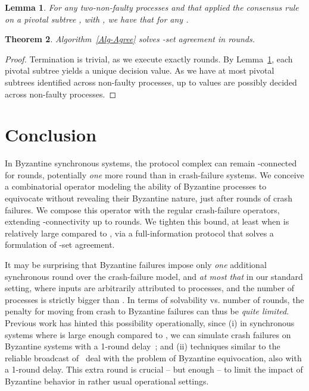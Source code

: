 \documentclass[11pt]{article}
\newtheorem{theorem}{Theorem}[section]
\newtheorem{lemma}[theorem]{Lemma}
\begin{document}
\begin{lemma}
\label{lemma-consensus-pivotal}
For any two-non-faulty processes  and  that applied the consensus rule on a pivotal subtree ,
with ,
we have that  for any .
\end{lemma}


\begin{comment}
\begin{lemma}
\label{lemma-decision-pivotal}
For any two-non-faulty processes  and  that decide based on a pivotal subtree ,
with ,
the decision value
(i) is well-defined;
and (ii) is an input value of a non-faulty process.
\end{lemma}
\end{comment}

\begin{theorem}
\label{theorem-ksetcorrectness}
Algorithm~\ref{Alg-Agree} solves -set agreement
in  rounds.
\end{theorem}
\begin{proof}
Termination is trivial,
as we execute exactly  rounds. 
By Lemma~\ref{lemma-consensus-pivotal},
each pivotal subtree yields a unique decision value.
As we have at most  pivotal subtrees identified across non-faulty processes,
up to  values are possibly decided across non-faulty processes.
\end{proof}

\section{Conclusion}

In Byzantine synchronous systems,
the protocol complex can remain -connected for  rounds,
potentially \emph{one} more round than in crash-failure systems.
We conceive a combinatorial operator modeling the ability of Byzantine processes
to equivocate without revealing their Byzantine nature,
just after  rounds of crash failures.
We compose this operator with the regular crash-failure operators,
extending -connectivity up to  rounds.
We tighten this bound,
at least when  is relatively large compared to ,
via a full-information protocol
that solves a formulation of -set agreement.

It may be surprising that Byzantine failures
impose only \emph{one} additional synchronous round over the crash-failure model,
and \emph{at most that} in our standard setting,
where inputs are arbitrarily attributed to processes,
and the number of processes is strictly bigger than .
In terms of solvability vs. number of rounds,
the penalty for moving from crash to Byzantine failures
can thus be \emph{quite limited}.
Previous work has hinted this possibility operationally, since
(i) in synchronous systems where  is large enough compared to ,
we can simulate crash failures on Byzantine systems with a 1-round delay~\cite{BazziNeiger01};
and (ii) techniques similar to the reliable broadcast of~\cite{Bracha,SriTouRB}
deal with the problem of Byzantine equivocation,
also with a 1-round delay.
This extra round is crucial -- but enough -- to limit the impact of Byzantine behavior
in rather usual operational settings.
\end{document}
